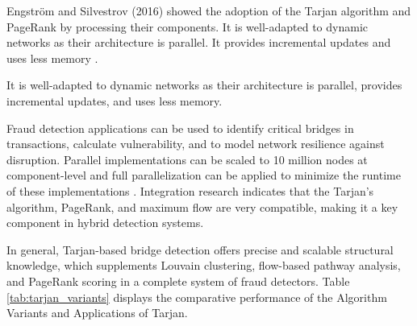 \documentclass[lettersize,journal]{IEEEtran}
\begin{document}
Engström and Silvestrov (2016) showed the adoption of the Tarjan algorithm and PageRank by processing their components. It is well-adapted to dynamic networks as their architecture is parallel. It provides incremental updates and uses less memory \cite{engstrom2016pagerank}.

It is well-adapted to dynamic networks as their architecture is parallel, provides incremental updates, and uses less memory.

Fraud detection applications can be used to identify critical bridges in transactions, calculate vulnerability, and to model network resilience against disruption. Parallel implementations can be scaled to 10 million nodes at component-level and full parallelization can be applied to minimize the runtime of these implementations \cite{liu2024parallel}. Integration research indicates that the Tarjan’s algorithm, PageRank, and maximum flow are very compatible, making it a key component in hybrid detection systems.

In general, Tarjan-based bridge detection offers precise and scalable structural knowledge, which supplements Louvain clustering, flow-based pathway analysis, and PageRank scoring in a complete system of fraud detectors. Table \ref{tab:tarjan_variants} displays the comparative performance of the Algorithm Variants and Applications of Tarjan.
\end{document}
